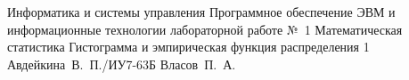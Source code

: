 \makereporttitle
{Информатика и системы управления} %
{Программное обеспечение ЭВМ и информационные технологии} %
{лабораторной работе №~1} %
{Математическая статистика} %
{Гистограмма и эмпирическая функция распределения} %
{1} %
{Авдейкина~В.~П./ИУ7-63Б} %
{Власов~П.~А.} %